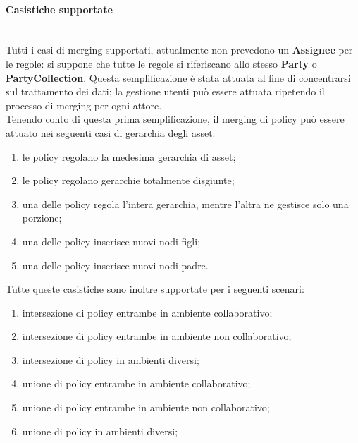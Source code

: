 \documentclass[12pt,a4paper,twoside]{book}
\begin{document}
\paragraph{Casistiche supportate}\mbox{}\\
Tutti i casi di merging supportati, attualmente non prevedono un \textbf{Assignee} per le regole: si suppone che tutte le regole si riferiscano allo stesso \textbf{Party} o \textbf{PartyCollection}. Questa semplificazione è stata attuata al fine di concentrarsi sul trattamento dei dati; la gestione utenti può essere attuata ripetendo il processo di merging per ogni attore.\\
Tenendo conto di questa prima semplificazione, il merging di policy può essere attuato nei seguenti casi di gerarchia degli asset:
\begin{enumerate}
	\item le policy regolano la medesima gerarchia di asset;
	\item le policy regolano gerarchie totalmente disgiunte;
	\item una delle policy regola l'intera gerarchia, mentre l'altra ne gestisce solo una porzione;
	\item una delle policy inserisce nuovi nodi figli;
	\item una delle policy inserisce nuovi nodi padre.
\end{enumerate}
Tutte queste casistiche sono inoltre supportate per i seguenti scenari:
\begin{enumerate}
	\item intersezione di policy entrambe in ambiente collaborativo;
	\item intersezione di policy entrambe in ambiente non collaborativo;
	\item intersezione di policy in ambienti diversi;
	\item unione di policy entrambe in ambiente collaborativo;
	\item unione di policy entrambe in ambiente non collaborativo;
	\item unione di policy in ambienti diversi;
\end{enumerate}
\end{document}
